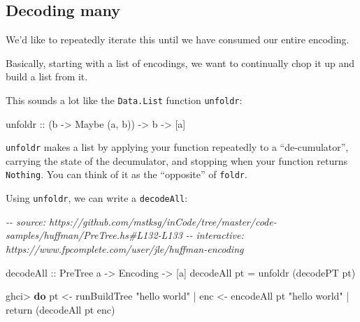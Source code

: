 \documentclass[]{article}
\newenvironment{Shaded}{}{}
\newcommand{\CommentTok}[1]{\textcolor[rgb]{0.38,0.63,0.69}{\textit{#1}}}
\newcommand{\DataTypeTok}[1]{\textcolor[rgb]{0.56,0.13,0.00}{#1}}
\newcommand{\FunctionTok}[1]{\textcolor[rgb]{0.02,0.16,0.49}{#1}}
\newcommand{\KeywordTok}[1]{\textcolor[rgb]{0.00,0.44,0.13}{\textbf{#1}}}
\newcommand{\NormalTok}[1]{#1}
\newcommand{\OperatorTok}[1]{\textcolor[rgb]{0.40,0.40,0.40}{#1}}
\newcommand{\OtherTok}[1]{\textcolor[rgb]{0.00,0.44,0.13}{#1}}
\newcommand{\StringTok}[1]{\textcolor[rgb]{0.25,0.44,0.63}{#1}}
\begin{document}
\hypertarget{decoding-many}{%
\subsection{Decoding many}\label{decoding-many}}

We'd like to repeatedly iterate this until we have consumed our entire encoding.

Basically, starting with a list of encodings, we want to continually chop it up
and build a list from it.

This sounds a lot like the \texttt{Data.List} function \texttt{unfoldr}:

\begin{Shaded}
\begin{Highlighting}[]
\OtherTok{unfoldr ::}\NormalTok{ (b }\OtherTok{{-}>} \DataTypeTok{Maybe}\NormalTok{ (a, b)) }\OtherTok{{-}>}\NormalTok{ b }\OtherTok{{-}>}\NormalTok{ [a]}
\end{Highlighting}
\end{Shaded}

\texttt{unfoldr} makes a list by applying your function repeatedly to a
``de-cumulator'', carrying the state of the decumulator, and stopping when your
function returns \texttt{Nothing}. You can think of it as the ``opposite'' of
\texttt{foldr}.

Using \texttt{unfoldr}, we can write a \texttt{decodeAll}:

\begin{Shaded}
\begin{Highlighting}[]
\CommentTok{{-}{-} source: https://github.com/mstksg/inCode/tree/master/code{-}samples/huffman/PreTree.hs\#L132{-}L133}
\CommentTok{{-}{-} interactive: https://www.fpcomplete.com/user/jle/huffman{-}encoding}

\OtherTok{decodeAll ::} \DataTypeTok{PreTree}\NormalTok{ a }\OtherTok{{-}>} \DataTypeTok{Encoding} \OtherTok{{-}>}\NormalTok{ [a]}
\NormalTok{decodeAll pt }\OtherTok{=}\NormalTok{ unfoldr (decodePT pt)}
\end{Highlighting}
\end{Shaded}

\begin{Shaded}
\begin{Highlighting}[]
\NormalTok{ghci}\OperatorTok{>} \KeywordTok{do}\NormalTok{ pt  }\OtherTok{<{-}}\NormalTok{ runBuildTree }\StringTok{"hello world"}
 \OperatorTok{|}\NormalTok{    enc }\OtherTok{<{-}}\NormalTok{ encodeAll pt }\StringTok{"hello world"}
 \OperatorTok{|}    \FunctionTok{return}\NormalTok{ (decodeAll pt enc)}
\end{Highlighting}
\end{Shaded}
\end{document}

